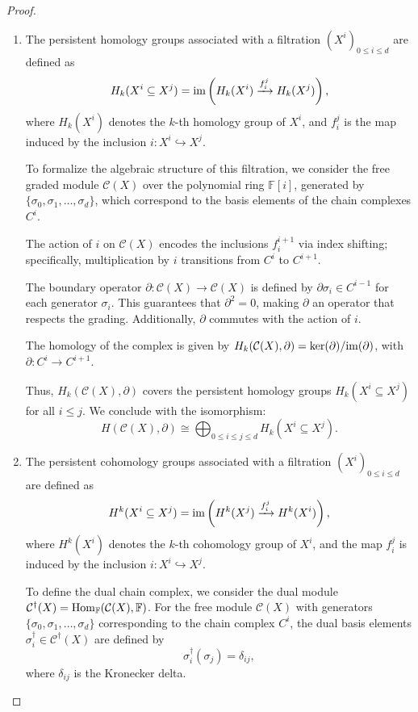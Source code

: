 \begin{proof}\noindent
\begin{enumerate}
\item The persistent homology groups associated with a filtration \( (X^i)_{0 \leq i \leq d} \) are defined as
\[
H_k(X^i \subseteq X^j) = \mathrm{im}\left( H_k(X^i) \xrightarrow{f_{i}^{j}} H_k(X^j) \right),
\]
where \( H_k(X^i) \) denotes the \( k \)-th homology group of \( X^i \), and \( f_{i}^{j} \) is the map induced by the inclusion \( i: X^i \hookrightarrow X^j \).

To formalize the algebraic structure of this filtration, we consider the free graded module \( \mathcal{C}(X) \) over the polynomial ring \( \mathbb{F}[i] \), generated by \( \{ \sigma_0, \sigma_1, \ldots, \sigma_d \} \), which correspond to the basis elements of the chain complexes \( C^i \).

The action of \( i \) on \( \mathcal{C}(X) \) encodes the inclusions \( f_{i}^{i+1} \) via index shifting; specifically, multiplication by \( i \) transitions from \( C^i \) to \( C^{i+1} \).

The boundary operator \( \partial: \mathcal{C}(X) \to \mathcal{C}(X) \) is defined by \( \partial \sigma_i \in C^{i-1} \) for each generator \( \sigma_i \). This guarantees that $\partial^2 = 0$, making \( \partial \) an operator that respects the grading. Additionally, \( \partial \) commutes with the action of \( i \).

The homology of the complex is given by $H_k(\mathcal{C}(X), \partial) = \ker(\partial) / \mathrm{im}(\partial)$, with \( \partial: C^i \to C^{i+1} \).

Thus, \( H_k(\mathcal{C}(X), \partial) \) covers the persistent homology groups \( H_k(X^i \subseteq X^j) \) for all \( i \leq j \). We conclude with the isomorphism:
\[
H(\mathcal{C}(X), \partial) \cong \bigoplus_{0 \leq i \leq j \leq d} H_k(X^i \subseteq X^j).
\]

\item The persistent cohomology groups associated with a filtration \( (X^i)_{0 \leq i \leq d} \) are defined as
\[
H^k(X^i \subseteq X^j) = \mathrm{im}\left( H^k(X^j) \xrightarrow{f_{i}^{j}} H^k(X^i) \right),
\]
where \( H^k(X^i) \) denotes the \( k \)-th cohomology group of \( X^i \), and the map \( f_{i}^{j} \) is induced by the inclusion \( i: X^i \hookrightarrow X^j \).

To define the dual chain complex, we consider the dual module \( \mathcal{C}^\dagger(X) = {\mathrm{Hom}}_{\mathbb{F}}(\mathcal{C}(X), {\mathbb{F}}) \). For the free module \( \mathcal{C}(X) \) with generators \( \{ \sigma_0, \sigma_1, \ldots, \sigma_d \} \) corresponding to the chain complex \( C^i \), the dual basis elements \( \sigma_i^\dagger \in \mathcal{C}^\dagger(X) \) are defined by
\[
\sigma_i^\dagger(\sigma_j) = \delta_{ij},
\]
where \( \delta_{ij} \) is the Kronecker delta.


\end{enumerate}
\end{proof}
